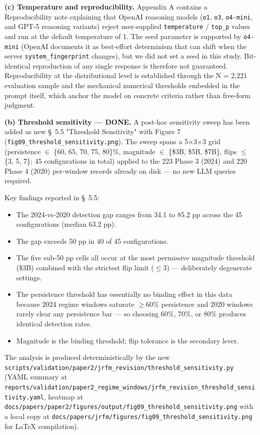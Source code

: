 \documentclass[11pt,a4paper]{article}
\begin{document}
\textbf{(c) Temperature and reproducibility.} Appendix A contains a
Reproducibility note explaining that OpenAI reasoning models
(\texttt{o1}, \texttt{o3}, \texttt{o4-mini}, and GPT-5 reasoning variants) reject
user-supplied \texttt{temperature} / \texttt{top\_p} values and run at the default
temperature of 1. The seed parameter is supported by \texttt{o4-mini}
(OpenAI documents it as best-effort determinism that can shift when
the server \texttt{system\_fingerprint} changes), but we did not set a seed
in this study. Bit-identical reproduction of any single response is
therefore not guaranteed. Reproducibility at the distributional level
is established through the N = 2,221 evaluation sample and the
mechanical numerical thresholds embedded in the prompt itself, which
anchor the model on concrete criteria rather than free-form judgment.

\textbf{(b) Threshold sensitivity --- DONE.} A post-hoc sensitivity sweep has
been added as new \S{}~5.5 "Threshold Sensitivity" with Figure 7
(\texttt{fig09\_threshold\_sensitivity.png}). The sweep spans a 5$\times$3$\times$3 grid
(persistence $\in$ \{60, 65, 70, 75, 80\}\%, magnitude $\in$ \{\$3B, \$5B, \$7B\},
flips $\leq$ \{3, 5, 7\}; 45 configurations in total) applied to the 223
Phase 3 (2024) and 220 Phase 4 (2020) per-window records already on
disk --- no new LLM queries required.

Key findings reported in \S{}~5.5:

\begin{itemize}
\item The 2024-vs-2020 detection gap ranges from 34.1 to 85.2 pp across the 45 configurations (median 63.2 pp).
\item The gap exceeds 50 pp in 40 of 45 configurations.
\item The five sub-50 pp cells all occur at the most permissive magnitude threshold (\$3B) combined with the strictest flip limit ($\leq$3) --- deliberately degenerate settings.
\item The persistence threshold has essentially no binding effect in this data because 2024 regime windows saturate $\geq$60\% persistence and 2020 windows rarely clear any persistence bar --- so choosing 60\%, 70\%, or 80\% produces identical detection rates.
\item Magnitude is the binding threshold; flip tolerance is the secondary lever.
\end{itemize}

The analysis is produced deterministically by the new
\texttt{scripts/validation/paper2/jrfm\_revision/threshold\_sensitivity.py}
(YAML summary at
\texttt{reports/validation/paper2\_regime\_windows/jrfm\_revision\_threshold\_sensitivity.yaml},
heatmap at \texttt{docs/papers/paper2/figures/output/fig09\_threshold\_sensitivity.png}
with a local copy at \texttt{docs/papers/jrfm/figures/fig09\_threshold\_sensitivity.png}
for LaTeX compilation).
\end{document}

